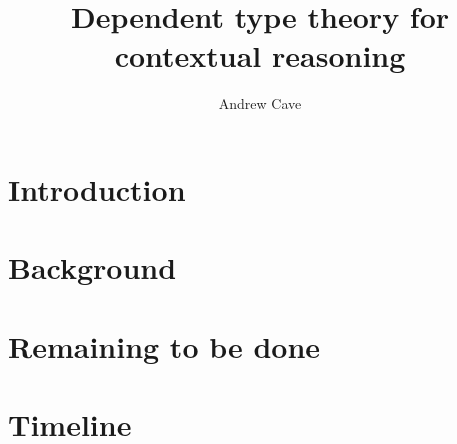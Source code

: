 \documentclass{article}
\author{Andrew Cave}
\title{Dependent type theory for contextual reasoning}
\begin{document}
\maketitle

\section{Introduction}
\section{Background}
\section{Remaining to be done}
\section{Timeline}
\end{document}
